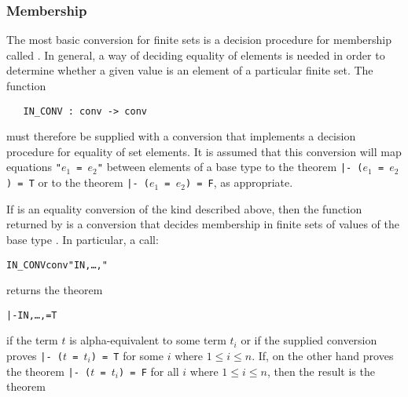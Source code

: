 \subsubsection{Membership}\label{inconv}

The%
 most basic
conversion for finite sets is a decision procedure for membership called
.  In general, a way of deciding equality of elements is needed in
order to determine whether a given value is an element of a particular finite
set.  The function

\begin{hol}\begin{verbatim}
   IN_CONV : conv -> conv
\end{verbatim}\end{hol}

\noindent must therefore be supplied with a conversion that implements a
decision procedure for equality of set elements.  It is assumed that this
conversion will map equations {\small\tt"$e_1$ = $e_2$"} between elements of a
base type  to the theorem {\small\tt |- ($e_1$ = $e_2$) = T} or to the
theorem {\small\tt |- ($e_1$ = $e_2$) = F}, as appropriate.

If  is an equality conversion of the kind described above, then the
function returned by  is a conversion that decides membership
in finite sets of values of the base type .  In particular, a call:

\begin{hol}\begin{alltt}
   IN\_CONV conv " IN \lb{},\dots,\rb"
\end{alltt}\end{hol}

\noindent returns the theorem

\begin{hol}\begin{alltt}
   |-  IN \lb{},\dots,\rb = T
\end{alltt}\end{hol}

\noindent if the term $t$ is alpha-equivalent to some term $t_i$ or if the
supplied conversion  proves {\tt |- ($t$ = $t_i$) = T} for some $i$
where $1 \leq i \leq n$.  If, on the other hand  proves the theorem
{\tt |- ($t$ = $t_i$) = F} for all $i$ where $1 \leq i \leq n$, then the result
is the theorem


